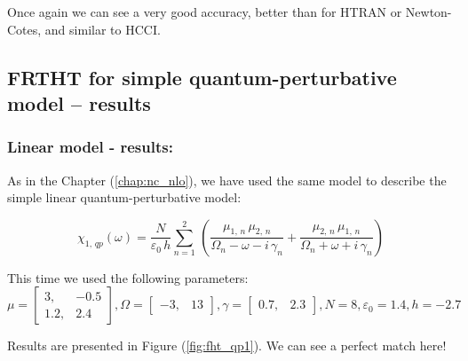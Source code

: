 \documentclass[12pt,twoside,a4paper]{article}
\numberwithin{equation}{subsection}
\numberwithin{figure}{subsection}
\begin{document}
Once again we can see a very good accuracy, better than for HTRAN or Newton-Cotes, and similar to HCCI.

\subsection{FRTHT for simple quantum-perturbative model -- results} \label{chap:hartley_quantum}

\subsubsection*{Linear model - results:}

As in the Chapter (\ref{chap:nc_nlo}), we have used the same model to describe the simple linear quantum-perturbative model: 

\begin{equation} \label{eq:fht_qp}
  {\chi_{1, \,qp}}(\omega ) = \frac {N}{\varepsilon_0\,h} \sum_{n=1}^{2}\,(\frac {{\mu_{1, \,n}}\,{ \mu_{2, \,n}}}{{\Omega_{n}}
  - \omega  - i\,{\gamma_{n}}} + \frac {{\mu_{2, \,n}}\,{\mu_{1, \,n}}}{{\Omega_{n}} + \omega + i\,{\gamma_{n}}})
\end{equation}

This time we used the following parameters: 
\begin{equation}
	\mu = \begin{bmatrix} 
		3,   & - 0.5 \\ 
		1.2, &   2.4 
	\end{bmatrix} ,
	\Omega = \begin{bmatrix} - 3, & 13  \end{bmatrix} , 
    \gamma = \begin{bmatrix} 0.7, & 2.3 \end{bmatrix} ,   
    N = 8, 
    \varepsilon_0 = 1.4, 
    h = - 2.7
\end{equation}

Results are presented in Figure (\ref{fig:fht_qp1}). We can see a perfect match here!
\end{document}
